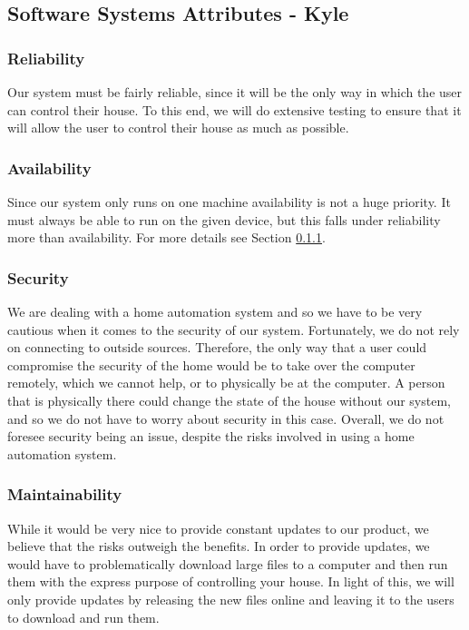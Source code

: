 \documentclass{article}
\begin{document}
\subsection{Software Systems Attributes - Kyle}

\subsubsection{Reliability} \label{sec:reliability}
Our system must be fairly reliable, since it will be the only way in which the user can control their house. To this end, we will do extensive testing to ensure that it will allow the user to control their house as much as possible.

\subsubsection{Availability}
Since our system only runs on one machine availability is not a huge priority. It must always be able to run on the given device, but this falls under reliability more than availability. For more details see Section \ref{sec:reliability}.

\subsubsection{Security}
We are dealing with a home automation system and so we have to be very cautious when it comes to the security of our system. Fortunately, we do not rely on connecting to outside sources. Therefore, the only way that a user could compromise the security of the home would be to take over the computer remotely, which we cannot help, or to physically be at the computer. A person that is physically there could change the state of the house without our system, and so we do not have to worry about security in this case. Overall, we do not foresee security being an issue, despite the risks involved in using a home automation system.

\subsubsection{Maintainability}
While it would be very nice to provide constant updates to our product, we believe that the risks outweigh the benefits. In order to provide updates, we would have to problematically download large files to a computer and then run them with the express purpose of controlling your house. In light of this, we will only provide updates by releasing the new files online and leaving it to the users to download and run them.
\end{document}
